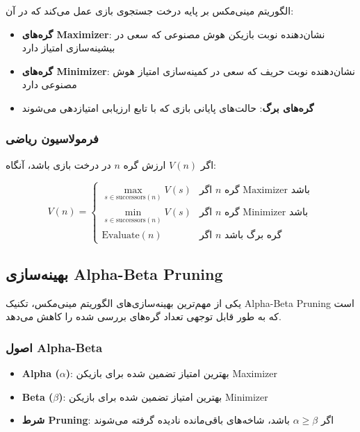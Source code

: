 \documentclass[12pt]{article}
\begin{document}
	الگوریتم مینی‌مکس بر پایه درخت جستجوی بازی عمل می‌کند که در آن:
	
	\begin{itemize}
		\item \textbf{گره‌های Maximizer}: نشان‌دهنده نوبت بازیکن هوش مصنوعی که سعی در بیشینه‌سازی امتیاز دارد
		\item \textbf{گره‌های Minimizer}: نشان‌دهنده نوبت حریف که سعی در کمینه‌سازی امتیاز هوش مصنوعی دارد
		\item \textbf{گره‌های برگ}: حالت‌های پایانی بازی که با تابع ارزیابی امتیازدهی می‌شوند
	\end{itemize}
	
	\subsubsection{فرمولاسیون ریاضی}
	
	اگر $V(n)$ ارزش گره $n$ در درخت بازی باشد، آنگاه:
	
	$$V(n) = \begin{cases}
		\max_{s \in \text{successors}(n)} V(s) & \text{اگر } n \text{ گره Maximizer باشد} \\
		\min_{s \in \text{successors}(n)} V(s) & \text{اگر } n \text{ گره Minimizer باشد} \\
		\text{Evaluate}(n) & \text{اگر } n \text{ گره برگ باشد}
	\end{cases}$$
	
	\subsection{بهینه‌سازی Alpha-Beta Pruning}
	
	یکی از مهم‌ترین بهینه‌سازی‌های الگوریتم مینی‌مکس، تکنیک Alpha-Beta Pruning است که به طور قابل توجهی تعداد گره‌های بررسی شده را کاهش می‌دهد.
	
	\subsubsection{اصول Alpha-Beta}
	
	\begin{itemize}
		\item \textbf{Alpha ($\alpha$)}: بهترین امتیاز تضمین شده برای بازیکن Maximizer
		\item \textbf{Beta ($\beta$)}: بهترین امتیاز تضمین شده برای بازیکن Minimizer
		\item \textbf{شرط Pruning}: اگر $\alpha \geq \beta$ باشد، شاخه‌های باقی‌مانده نادیده گرفته می‌شوند
	\end{itemize}
	
\end{document}

